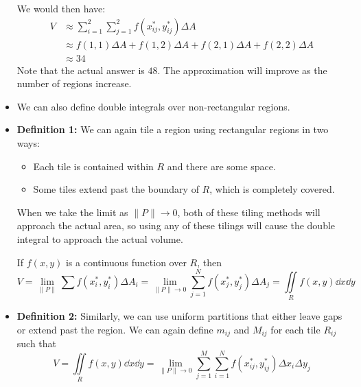 \begin{itemize}
\begin{example}
        We would then have: 
        \begin{align}
            V & \approx \sum_{i=1}^2\sum_{j=1}^2 f(x_{ij}^*,y_{ij}^*)\Delta A \\ 
            &\approx f(1,1)\Delta A + f(1,2)\Delta A + f(2,1)\Delta A + f(2,2) \Delta A \\ 
            &\approx 34
        \end{align}
        Note that the actual answer is $48$. The approximation will improve as the number of regions increase.
    \end{example}
    \item We can also define double integrals over non-rectangular regions. 
    \item \textbf{Definition 1:} We can again tile a region using rectangular regions in two ways: 
    \begin{itemize}
        \item Each tile is contained within $R$ and there are some space.
        \item Some tiles extend past the boundary of $R$, which is completely covered.
    \end{itemize}
    When we take the limit as $\lVert P\rVert\rightarrow 0$, both of these tiling methods will approach the actual area, so using any of these tilings will cause the double integral to approach the actual volume.

    If $f(x,y)$ is a continuous function over $R$, then 
    \begin{equation}
        V=\lim_{\lVert P\rVert} \sum f(x_i^*,y_i^*)\Delta A_i = \lim_{\lVert P\rVert \rightarrow 0} \sum_{j=1}^N f(x_j^*,y_j^*)\Delta A_j = \iint\limits_{R} f(x,y)\dd{x}\dd{y}
    \end{equation}
    \item \textbf{Definition 2:} Similarly, we can use uniform partitions that either leave gaps or extend past the region. We can again define $m_{ij}$ and $M_{ij}$ for each tile $R_{ij}$ such that 
    \begin{equation}
        V = \iint\limits_{R} f(x,y)\dd{x}\dd{y} = \lim_{\lVert P\rVert \rightarrow 0} \sum_{j=1}^M \sum_{i=1}^N f(x_{ij}^*,y_{ij}^*)\Delta x_i\Delta y_j
    \end{equation}
\end{itemize}
